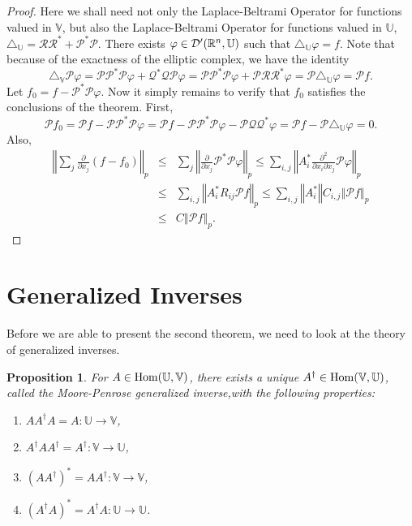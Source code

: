 \documentclass{amsart}
\newtheorem{prop}[prop]{Proposition}
\theoremstyle{definition}
\numberwithin{equation}{section}
\begin{document}
\begin{proof}
Here we shall need not only the Laplace-Beltrami Operator for functions valued in ${\mathbb{V}}$, but also the Laplace-Beltrami Operator for functions valued in ${\mathbb{U}}$, $\triangle_{\mathbb{U}} = {\mathcal{R}}{\mathcal{R}}^* + {\mathcal{P}}^*{\mathcal{P}}$.  There exists ${\varphi} \in {\mathcal{D}}'(\Bbb R^n, {\mathbb{U}})$ such that $\triangle_{\mathbb{U}} {\varphi} =f$.  Note that because of the exactness of the elliptic complex, we have the identity $$\triangle_{\mathbb{V}} {\mathcal{P}}{\varphi} = {\mathcal{P}}{\mathcal{P}}^*{\mathcal{P}}{\varphi} + {\mathcal{Q}}^*{\mathcal{Q}}{\mathcal{P}}{\varphi} = {\mathcal{P}}{\mathcal{P}}^*{\mathcal{P}}{\varphi} + {\mathcal{P}}{\mathcal{R}}{\mathcal{R}}^*{\varphi} = {\mathcal{P}}\triangle_{\mathbb{U}}{\varphi} = {\mathcal{P}} f.$$  Let $f_0 = f - {\mathcal{P}}^*{\mathcal{P}}{\varphi}$.  Now it simply remains to verify that $f_0$ satisfies the conclusions of the theorem.  First, $${\mathcal{P}} f_0 = {\mathcal{P}} f - {\mathcal{P}}{\mathcal{P}}^*{\mathcal{P}}{\varphi} = {\mathcal{P}} f - {\mathcal{P}}{\mathcal{P}}^*{\mathcal{P}}{\varphi} - {\mathcal{P}}{\mathcal{Q}}{\mathcal{Q}}^*{\varphi} = {\mathcal{P}} f - {\mathcal{P}} \triangle_{\mathbb{U}} {\varphi} =0.$$  Also, \begin{eqnarray*} {\left\Vert{\sum_j \frac {\partial}{\partial x_j} (f-f_0)}\right\Vert}_p & \leq & \sum_j {\left\Vert{\frac {\partial}{\partial x_j} {\mathcal{P}}^*{\mathcal{P}}{\varphi}}\right\Vert}_p \leq \sum_{i,j} {\left\Vert{A_i^* \frac {\partial^2}{\partial x_i \partial x_j} {\mathcal{P}}{\varphi}}\right\Vert}_p \\ & \leq & \sum_{i,j} {\left\Vert{ A_i^* R_{ij} {\mathcal{P}} f}\right\Vert}_p \leq \sum_{i,j} {\left\Vert{A_i^*}\right\Vert} C_{i,j} {\left\Vert{{\mathcal{P}} f}\right\Vert}_p \\ & \leq & C{\left\Vert{{\mathcal{P}} f}\right\Vert}_p.\end{eqnarray*}
\end{proof}

\section{Generalized Inverses}\label{GI}

Before we are able to present the second theorem, we need to look at the theory of generalized inverses.
\begin{prop}For $A\in \operatorname{Hom}(\Bbb U, \Bbb V)$, there exists a unique $A^\dagger \in \operatorname{Hom}(\Bbb V, \Bbb U)$, called the \textit{Moore-Penrose generalized inverse},with the following properties:
\begin{enumerate}
\item $AA^\dagger A=A: {\mathbb{U}} \to {\mathbb{V}}$,
\item $A^\dagger AA^\dagger = A^\dagger: {\mathbb{V}} \to {\mathbb{U}}$,
\item $(AA^\dagger)^*=AA^\dagger: {\mathbb{V}} \to {\mathbb{V}}$,
\item $(A^\dagger A)^* = A^\dagger A: {\mathbb{U}} \to {\mathbb{U}}$.
\end{enumerate}\end{prop}
\end{document}
